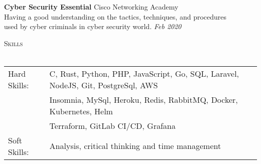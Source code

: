 \documentclass[a4paper]{article}
\newcommand{\lineunder} {
    \vspace*{-8pt} \\
    \hspace*{-18pt} \hrulefill \\
}
\newcommand{\header} [1] {
    {\hspace*{-18pt}\vspace*{6pt} \textsc{#1}}
    \vspace*{-6pt} \lineunder
}
\begin{document}


\textbf{Cyber Security Essential} \hfill Cisco Networking Academy\\
Having a good understanding on the tactics, techniques, and procedures \\used by cyber criminals in cyber security world. \hfill \textit{Feb 2020}\\
\vspace*{2mm}

\header{Skills}
\begin{tabular}{ l l }
	Hard Skills:              & C, Rust, Python, PHP, JavaScript, Go, SQL, Laravel, NodeJS, Git, PostgreSql, AWS\\ & Insomnia, MySql, Heroku, Redis, RabbitMQ, Docker, Kubernetes, Helm\\ & Terraform, GitLab CI/CD, Grafana\\
	Soft Skills:                    & Analysis, critical thinking and time management\\
\end{tabular}
\vspace{2mm}

\ 
\end{document}
